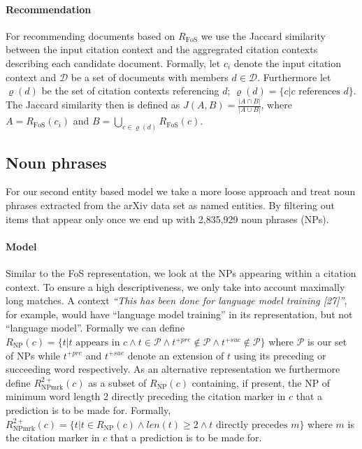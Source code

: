 \paragraph{Recommendation} For recommending documents based on $R_{\text{FoS}}$ we use the Jaccard similarity between the input citation context and the aggregrated citation contexts describing each candidate document. Formally, let $c_i$ denote the input citation context and $\mathcal{D}$ be a set of documents with members $d\in \mathcal{D}$. Furthermore let $\varrho(d)$ be the set of citation contexts referencing $d$; ${\varrho(d)=\{c|c\text{ references } d\}}$. The Jaccard similarity then is defined as ${J(A,B)=\frac{|A\cap B|}{|A\cup B|}}$, where $A = R_{\text{FoS}}(c_i)$ and $B=\bigcup\limits_{c \in \varrho(d)} R_{\text{FoS}}(c)$.

\subsection{Noun phrases}\label{sec:npmodel}
For our second entity based model we take a more loose approach and treat noun phrases extracted from the arXiv data set as named entities. By filtering out items that appear only once we end up with 2,835,929 noun phrases (NPs).

\paragraph{Model} Similar to the FoS representation, we look at the NPs appearing within a citation context. To ensure a high descriptiveness, we only take into account maximally long matches. A context \emph{``This has been done for language model training [27]''}, for example, would have ``language model training'' in its representation, but not ``language model''. Formally we can define ${R_{\text{NP}}(c) = \{t|t\text{ appears in }c \land t\in \mathcal{P} \land t^{+pre} \notin \mathcal{P}\land t^{+suc} \notin \mathcal{P}\}}$ where $\mathcal{P}$ is our set of NPs while $t^{+pre}$ and $t^{+suc}$ denote an extension of $t$ using its preceding or succeeding word respectively. As an alternative representation we furthermore define ${R_{\text{NPmrk}}^{2+}(c)}$ as a subset of ${R_{\text{NP}}(c)}$ containing, if present, the NP of minimum word length 2 directly preceding the citation marker in $c$ that a prediction is to be made for. Formally, ${R_{\text{NPmrk}}^{2+}(c) = \{t|t\in R_{\text{NP}}(c)\land len(t)\geq 2 \land t\text{ directly precedes } m\}}$ where $m$ is the citation marker in $c$ that a prediction is to be made for.

